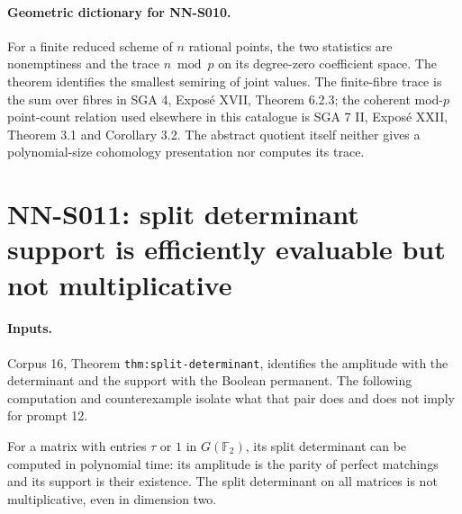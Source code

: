 \paragraph{Geometric dictionary for NN-S010.}
For a finite reduced scheme of $n$ rational points, the two
statistics are nonemptiness and the trace $n\bmod p$ on its
degree-zero coefficient space. The theorem identifies the
smallest semiring of joint values. The finite-fibre trace is
the sum over fibres in SGA 4, Expos\'e XVII, Theorem 6.2.3;
the coherent mod-$p$ point-count relation used elsewhere in
this catalogue is SGA 7 II, Expos\'e XXII, Theorem 3.1 and
Corollary 3.2. The abstract quotient itself neither gives a
polynomial-size cohomology presentation nor computes its trace.



\section{NN-S011: split determinant support is efficiently evaluable but not multiplicative}
\label{sec:NN-S011}

\paragraph{Inputs.}
Corpus 16, Theorem \texttt{thm:split-determinant}, identifies the
amplitude with the determinant and the support with the Boolean
permanent. The following computation and counterexample isolate
what that pair does and does not imply for prompt 12.

\begin{theorem}[NN-S011]
For a matrix with entries $\tau$ or $1$ in $G(\mathbb F_2)$,
its split determinant can be computed in polynomial time: its
amplitude is the parity of perfect matchings and its support is
their existence. The split determinant on all matrices is not
multiplicative, even in dimension two.
\end{theorem}

